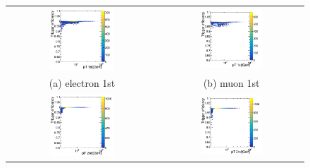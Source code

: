 \begin{figure}[htbp]
\centering
\begin{tabular}{cc}
 \includegraphics[width=0.45\textwidth]{Figs/Trigger/ele1.png} &
 \includegraphics[width=0.45\textwidth]{Figs/Trigger/mu1.png} \\
 (a) electron 1st & (b) muon 1st \\
 \includegraphics[width=0.45\textwidth]{Figs/Trigger/ele2.png} &
 \includegraphics[width=0.45\textwidth]{Figs/Trigger/mu2.png} \\

\end{tabular}
\end{figure}
